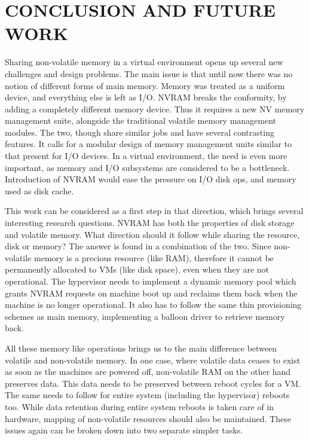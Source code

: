 
\chapter{\uppercase{Conclusion and Future Work}}


Sharing non-volatile memory in a virtual environment opens up several new challenges and design problems. The main issue is that until now there was no notion of different forms of main memory. Memory was treated as a uniform device, and everything else is left as I/O. NVRAM breaks the conformity, by adding a completely different memory device. Thus it requires a new NV memory management suite, alongside the traditional volatile memory management modules. The two, though share similar jobs and have several contrasting features. It calls for a modular design of memory management units similar to that present for I/O devices. In a virtual environment, the need is even more important, as memory and I/O subsystems are considered to be a bottleneck. Introduction of NVRAM would ease the pressure on I/O disk ops, and memory used as disk cache.

This work can be considered as a first step in that direction, which brings several interesting research questions. NVRAM has both the properties of disk storage and volatile memory. What direction should it follow while sharing the resource, disk or memory? The answer is found in a combination of the two. Since non-volatile memory is a precious resource (like RAM), therefore it cannot be permanently allocated to VMs (like disk space), even when they are not operational. The hypervisor needs to implement a dynamic memory pool which grants NVRAM requests on machine boot up and reclaims them back when the machine is no longer operational. It also has to follow the same thin provisioning schemes as main memory, implementing a balloon driver to retrieve memory back.

All these memory like operations brings us to the main difference between volatile and non-volatile memory. In one case, where volatile data ceases to exist as soon as the machines are powered off, non-volatile RAM on the other hand preserves data. This data needs to be preserved between reboot cycles for a VM. The same needs to follow for entire system (including the hypervisor) reboots too. While data retention during entire system reboots is taken care of in hardware, mapping of non-volatile resources should also be maintained. These issues again can be broken down into two separate simpler tasks.

